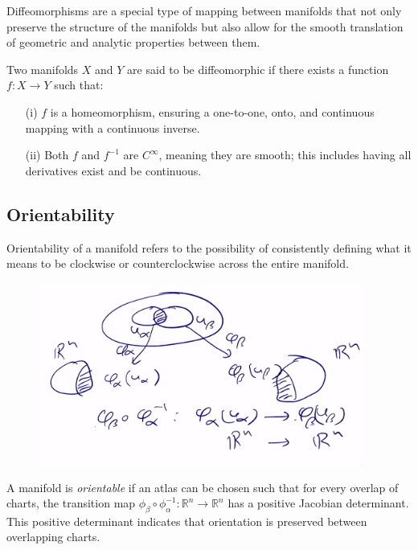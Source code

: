 \documentclass{article}
\begin{document}
Diffeomorphisms are a special type of mapping between manifolds that not only preserve the structure of the manifolds but also allow for the smooth translation of geometric and analytic properties between them.

\begin{theorem}
    Two manifolds \(X\) and \(Y\) are said to be diffeomorphic if there exists a function \(f: X \to Y\) such that:
    \begin{enumerate}
        \item[(i)] \(f\) is a homeomorphism, ensuring a one-to-one, onto, and continuous mapping with a continuous inverse.
        \item[(ii)] Both \(f\) and \(f^{-1}\) are \(C^\infty\), meaning they are smooth; this includes having all derivatives exist and be continuous.
    \end{enumerate}
\end{theorem}

\subsection{Orientability}
Orientability of a manifold refers to the possibility of consistently defining what it means to be clockwise or counterclockwise across the entire manifold.

\begin{figure}
    \begin{center}
        \includegraphics[width=0.95\textwidth]{figures/orientation.png}
    \end{center}
    \caption{}
\end{figure}

\begin{theorem}
    A manifold is \textit{orientable} if an atlas can be chosen such that for every overlap of charts, the transition map \(\phi_{\beta} \circ \phi_{\alpha}^{-1} : \mathbb{R}^n \rightarrow \mathbb{R}^n\) has a positive Jacobian determinant. This positive determinant indicates that orientation is preserved between overlapping charts.
\end{theorem}
\end{document}
